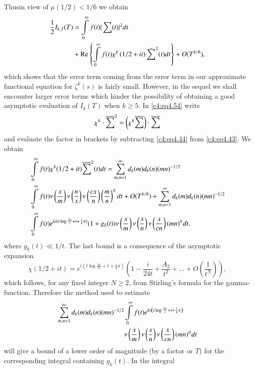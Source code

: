 Thus\pageoriginale in view of $\mu (1/2)< 1/6$ we obtain 
\begin{align}
  \frac{1}{2} I_{k, f}(T) & = \int\limits_0^\infty f(t)| \sum (t) |^2
  dt\label{c4:eq4.54} \\
  & + \operatorname{Re} \left\{\int\limits_0^\infty f(t) \chi^k \left(1/2 + it \right)
  \bar{\sum}^2 (t) dt \right\} + O (T^{k/6}),\notag
\end{align}
which shows that the error term coming from the error term in our
approximate functional equation for $\zeta^k (s)$ is fairly
small. However, in the sequel we shall encounter larger error terms
which hinder the possibility of obtaining a good asymptotic evaluation
of $I_k (T)$ when $k \geq 5$. In \eqref{c4:eq4.54} write
$$
\chi^k \cdot \overline{\sum}^2 = \left(\chi^k \overline{\sum} \right)\cdot \overline{\sum}
$$
and evaluate the factor in brackets by subtracting \eqref{c4:eq4.44}
from \eqref{c4:eq4.43}. We obtain
\begin{align*}
&  \int\limits_0^\infty f(t) \chi^k (1/2 + it) \overline{\sum}^2 (t) dt
  =\sum_{m, n=1}^\infty d_k (m) d_k (n) (mn)^{-1/2} \\
&   \int\limits_0^\infty f(t) \nu \left(\frac{x}{m} \right) \nu
  \left(\frac{n}{x} \right) \nu \left(\frac{cx}{n} \right)
  \left(\frac{m}{n} \right)^{it} dt + O(T ^{k/6})+ \sum_{m,
    n=1}^\infty d_k (m) d_k (n) (mn)^{-1/2}\\
&   \int\limits_0^\infty f(t) e^{ki (t \log \frac{2\pi}{t} + t +
    \frac{1}{4}\pi)} (1+ g_k (t)) \nu \left(\frac{x}{m} \right) \nu
  \left(\frac{x}{n} \right)\nu \left(\frac{x}{cn} \right) (mn)^{it} dt,
\end{align*}
where $g_k (t) \ll 1/t$. The last bound is a consequence of the
asymptotic expansion
$$
\chi(1/2 +it)=e^{i \left(t \log \frac{2 \pi}{t} + t + \frac{1}{4}\pi
  \right)} \left(1 - \frac{i}{24 t} + \frac{A_2}{t^2} + \ldots + O
\left(\frac{1}{t^N} \right) \right),
$$
which follows, for any fixed integer $N \geq 2$, from Stirling's
formula for the gamma-function. Therefore the method used to estimate
\begin{align}
  \sum_{m, n=1}^\infty d_k (m) d_k (n)(mn)^{-1/2}
  & \int\limits_0^\infty f(t) e^{ki \left(t \log \frac{2 \pi}{t} + t +
    \frac{1}{4} \pi\right)}\label{c4:eq4.55} \\
  &\nu \left(\frac{x}{m} \right) \nu
  \left(\frac{x}{n}  \right) \nu \left(\frac{x}{cn} \right)
  (mn)^{it}dt\notag
\end{align}
will give a bound of a lower order of magnitude (by a factor or $T$)
for the corresponding integral containing $g_k(t)$. In the integral
